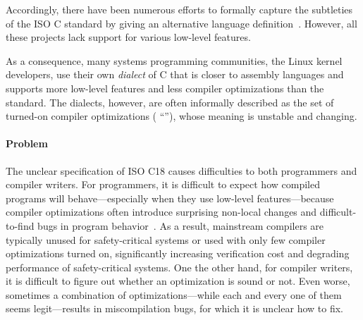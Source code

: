Accordingly, there have been numerous efforts to formally capture the subtleties of the ISO C
standard by giving an alternative language definition~\cite{compcert, vellvm, k-c, norrish,
  krebbers}.  However, all these projects lack support for various low-level features.

As a consequence, many systems programming communities, \eg{} the Linux kernel developers, use their
own \emph{dialect} of C that is closer to assembly languages and supports more low-level features
and less compiler optimizations than the standard.  The dialects, however, are often informally
described as the set of turned-on compiler optimizations (\eg{} ``''), whose meaning
is unstable and changing.


\paragraph{Problem}

The unclear specification of ISO C18 causes difficulties to both programmers and compiler writers.
For programmers, it is difficult to expect how compiled programs will behave---especially when they
use low-level features---because compiler optimizations often introduce surprising non-local changes
and difficult-to-find bugs in program behavior~\cite{wang2013towards,yang2011finding}.  As a result,
mainstream compilers are typically unused for safety-critical systems or used with only few compiler
optimizations turned on, significantly increasing verification cost and degrading performance of
safety-critical systems.  One the other hand, for compiler writers, it is difficult to figure out
whether an optimization is sound or not.  Even worse, sometimes a combination of
optimizations---while each and every one of them seems legit---results in miscompilation bugs, for
which it is unclear how to fix.




